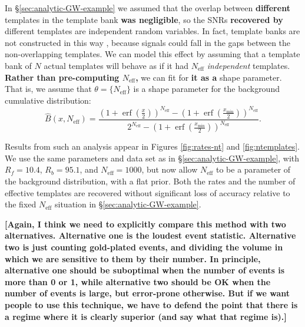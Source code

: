 \documentclass[aps,prd]{revtex4-1}
\newcommand{\xmin}{x_\mathrm{min}}
\newcommand{\ilya}[1]{{\color{red} \bf #1}}
\DeclareMathOperator{\erf}{erf}
\begin{document}
In \S \ref{sec:analytic-GW-example} we assumed that the overlap
between \ilya{different} templates in the template bank \ilya{was
  negligible}, so the SNRs \ilya{recovered by} different templates are
independent random variables.  In fact, template banks are not
constructed in this way \citep[e.g.,][]{Owen:1998dk,Ajith:2008},
because signals could fall in the gaps between the non-overlapping
templates.  We can model this effect by assuming that a template bank
of $N$ actual templates will behave as if it had $N_\mathrm{eff}$
\emph{independent} templates.  \ilya{Rather than pre-computing
  $N_\mathrm{eff}$,} we can fit for \ilya{it as a} shape parameter.
That is, we assume that \ilya{$\theta = \{N_\mathrm{eff}\}$} is a
shape parameter for the background cumulative distribution:
\begin{equation}
  \hat{B}\left(x, N_\mathrm{eff}\right) = \frac{\left( 1 + \erf\left( \frac{x}{2} \right)
    \right)^{N_\mathrm{eff}} - \left( 1 + \erf\left( \frac{\xmin}{2} \right)
    \right)^{N_\mathrm{eff}}}{2^{N_\mathrm{eff}} - \left( 1 + \erf\left( \frac{\xmin}{2} \right)
    \right)^{N_\mathrm{eff}} }.
\end{equation}

Results from such an analysis appear in Figures \ref{fig:rates-nt} and
\ref{fig:ntemplates}.  We use the same parameters and data set as in
\S \ref{sec:analytic-GW-example}, with $R_f = 10.4$, $R_b = 95.1$, and
$N_\mathrm{eff} = 1000$, but now allow $N_\mathrm{eff}$ to be a
parameter of the background distribution, with a flat prior.  Both the
rates and the number of effective templates are recovered without
significant loss of accuracy relative to the fixed $N_\mathrm{eff}$
situation in \S \ref{sec:analytic-GW-example}.

\ilya{[Again, I think we need to explicitly compare this method with
    two alternatives.  Alternative one is the loudest event statistic.
    Alternative two is just counting gold-plated events, and dividing
    the volume in which we are sensitive to them by their number.  In
    principle, alternative one should be suboptimal when the number of
    events is more than 0 or 1, while alternative two should be OK
    when the number of events is large, but error-prone otherwise.
    But if we want people to use this technique, we have to defend the
    point that there is a regime where it is clearly superior (and say
    what that regime is).]}
\end{document}
